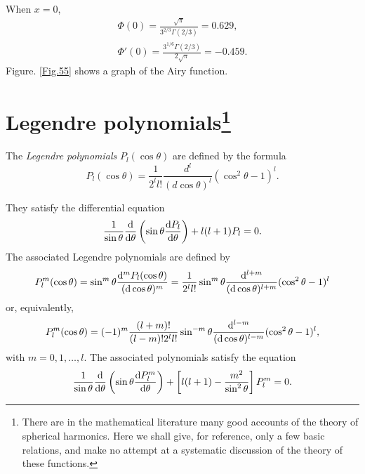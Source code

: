When $ x = 0 $,
\begin{equation}\label{b.8}
\begin{split}
\Phi(0)=\frac{\sqrt{\pi}}{3^{2/3}\Gamma(2/3)}=0.629,\\
\Phi'(0)=\frac{3^{1/6}\Gamma(2/3)}{2\sqrt{\pi}}=-0.459.
\end{split}
\end{equation}
Figure. \ref{Fig.55} shows a graph of the Airy function.



\section{Legendre polynomials\footnote{There are in the mathematical literature many good accounts of the theory of spherical harmonics. Here we shall give, for reference, only a few basic relations, and make no attempt at a systematic discussion of the theory of these functions.}}\label{Legendre polynomials}
The \textit{Legendre polynomials} $ P_l(\cos \theta) $ are defined by the formula
\begin{equation}\label{c.1}
P_l(\cos\theta)=\frac{1}{2^ll!}\frac{d^l}{(d\cos\theta)^l}(\cos^2\theta-1)^l.
\end{equation}



They satisfy the differential equation
\begin{equation}\label{c.2}
\frac{1}{\sin\theta}\frac{\mathrm{d}}{\mathrm{d}\theta}\left(\sin\theta\frac{\mathrm{d} P_l}{\mathrm{d}\theta} \right)+l(l+1)P_l=0.
\end{equation}
The associated Legendre polynomials are defined by
\begin{equation}\label{c.3}
P_l^m(\cos\theta)=\sin^m\theta\frac{\mathrm{d}^mP_l(\cos\theta)}{(\mathrm{d}\cos\theta)^m}=\frac{1}{2^ll!}\sin^m\theta\frac{\mathrm{d}^{l+m}}{(\mathrm{d}\cos\theta)^{l+m}}(\cos^2\theta-1)^l
\end{equation}
or, equivalently,
\begin{equation}\label{c.4}
P_l^m(\cos\theta)=(-1)^m\frac{(l+m)!}{(l-m)!2^ll!}\sin^{-m}\theta\frac{\mathrm{d}^{l-m}}{(\mathrm{d}\cos\theta)^{l-m}}(\cos^2\theta-1)^l,
\end{equation}
with $ m = 0, 1, \dots, l $. The associated polynomials satisfy the equation
\begin{equation}\label{c.5}
\frac{1}{\sin\theta}\frac{\mathrm{d}}{\mathrm{d}\theta}\left(\sin\theta\frac{\mathrm{d} P_l^m}{\mathrm{d}\theta} \right)+\left[l(l+1)-\frac{m^2}{\sin^2\theta} \right]P_l^m=0.
\end{equation}



